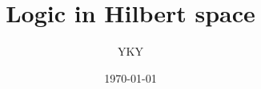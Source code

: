 


\usepackage{color}
\usepackage{mathtools}
\usepackage{hyperref}

\usepackage[backend=biber,style=authoryear]{biblatex}


\usepackage{graphicx} %
\usepackage{tikz-cd}
\usepackage{tikz}
\usepackage[export]{adjustbox}%
\usepackage{verbatim} %


\newcommand{\underdash}[1]{%
	\tikz[baseline=(toUnderline.base)]{
		\node[inner sep=1pt,outer sep=10pt] (toUnderline) {#1};
		\draw[dashed] ([yshift=-0pt]toUnderline.south west) -- ([yshift=-0pt]toUnderline.south east);
	}%
}%


\newcommand{\highlight}[1]{\colorbox{pink}{$\displaystyle #1$}}

\newcommand{\emp}[1]{{\color{violet}\textbf{#1}}}
\newcommand*\confoundFace{$\vcenter{\hbox{\texttt{[image: ../confounded-face.jpg]}}}$}

\newcommand*{\Cdot}{\raisebox{-0.5ex}{\scalebox{2}{$\cdot$}}}
\newcommand{\witness}{\scalebox{0.6}{$\blacksquare$}}
\providecommand\Heytingarrow{\relbar\joinrel\mathrel{\vcenter{\hbox{\scalebox{0.75}{$\rhd$}}}}}



\title{\cc{\bfseries\color{blue}{\Huge Logic in Hilbert space}}
{{\Huge Logic in Hilbert space}}}
\author{YKY} %
\date{\today} %

